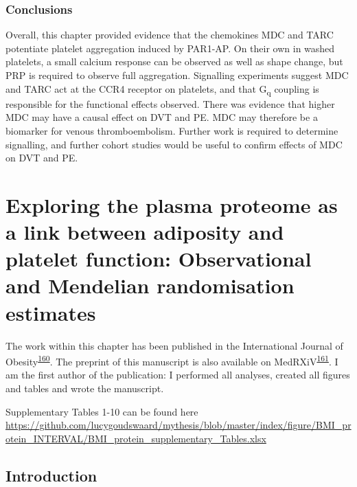 \documentclass[11pt,twoside]{bristolthesis}
\begin{document}
\hypertarget{conclusions}{%
\subsection{Conclusions}\label{conclusions}}

Overall, this chapter provided evidence that the chemokines MDC and TARC potentiate platelet aggregation induced by PAR1-AP. On their own in washed platelets, a small calcium response can be observed as well as shape change, but PRP is required to observe full aggregation. Signalling experiments suggest MDC and TARC act at the CCR4 receptor on platelets, and that G\textsubscript{q} coupling is responsible for the functional effects observed. There was evidence that higher MDC may have a causal effect on DVT and PE. MDC may therefore be a biomarker for venous thromboembolism. Further work is required to determine signalling, and further cohort studies would be useful to confirm effects of MDC on DVT and PE.

\hypertarget{BMI-protein-MR}{%
\chapter{Exploring the plasma proteome as a link between adiposity and platelet function: Observational and Mendelian randomisation estimates}\label{BMI-protein-MR}}

The work within this chapter has been published in the International Journal of Obesity\textsuperscript{\protect\hyperlink{ref-Goudswaard2021}{160}}. The preprint of this manuscript is also available on MedRXiV\textsuperscript{\protect\hyperlink{ref-Goudswaard2020}{161}}. I am the first author of the publication: I performed all analyses, created all figures and tables and wrote the manuscript.

Supplementary Tables 1-10 can be found here \url{https://github.com/lucygoudswaard/mythesis/blob/master/index/figure/BMI_protein_INTERVAL/BMI_protein_supplementary_Tables.xlsx}

\hypertarget{introduction}{%
\section{Introduction}\label{introduction}}
\end{document}
